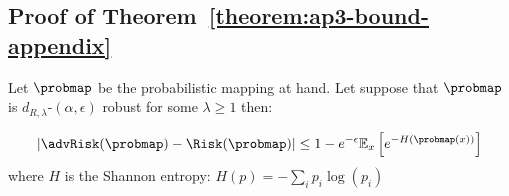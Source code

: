 \subsection{Proof of Theorem~\ref{theorem:ap3-bound-appendix}}


\begin{theorem}

\label{theorem:ap3-bound-appendix}
Let $\probmap$ be the probabilistic mapping at hand. Let suppose that  $\probmap$ is $d_{R,\lambda}$-$(\alpha,\epsilon)$ robust for some $\lambda\geq1$ then:

$$|\advRisk(\probmap)-\Risk(\probmap)|\leq 1-e^{-\epsilon}\mathbb{E}_x\left[e^{-H(\probmap(x))}\right]$$
where $H$ is the Shannon entropy: $H(p)=-\sum_i p_i \log(p_i)$
\end{theorem}

